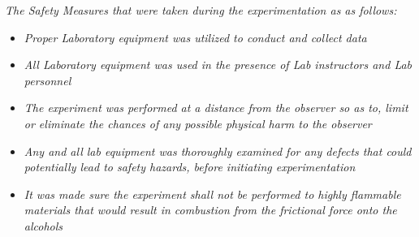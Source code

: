 

\textit{The Safety Measures that were taken during the experimentation as as follows:}

	\begin{itemize}
		\item \textit{Proper Laboratory equipment was utilized to conduct and collect data}
		\item \textit{All Laboratory equipment was used in the presence of Lab instructors and Lab personnel}
		\item \textit{The experiment was performed at a distance from the observer so as to, limit or eliminate the chances of any possible physical harm to the observer}
		\item \textit{Any and all lab equipment was thoroughly examined for any defects that could potentially lead to safety hazards, before initiating experimentation}
		\item \textit{It was made sure the experiment shall not be performed to highly flammable materials that would result in combustion from the frictional force onto the alcohols}
	\end{itemize}

